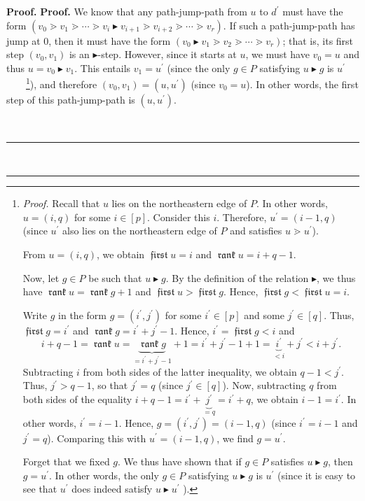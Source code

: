 \documentclass[numbers=enddot,12pt,final,onecolumn,notitlepage]{scrartcl}%
\theoremstyle{definition}
\newenvironment{verlong}{}{}
\DeclareMathOperator{\first}{\mathfrak{first}}
\DeclareMathOperator{\rank}{\mathfrak{rank}}
\newenvironment{proof}[1][Proof]{\noindent\textbf{#1.} }{\ \rule{0.5em}{0.5em}}
\begin{document}
\begin{proof}
\begin{verlong}
\begin{proof}
We know that any path-jump-path from $u$ to $d^{\prime}$ must have the form
\newline$\left(  v_{0}\gtrdot v_{1}\gtrdot\cdots\gtrdot v_{i}%
\blacktriangleright v_{i+1}\gtrdot v_{i+2}\gtrdot\cdots\gtrdot v_{r}\right)
$. If such a path-jump-path has jump at $0$, then it must have the form
$\left(  v_{0}\blacktriangleright v_{1}\gtrdot v_{2}\gtrdot\cdots\gtrdot
v_{r}\right)  $; that is, its first step $\left(  v_{0},v_{1}\right)  $ is an
$\blacktriangleright$-step. However, since it starts at $u$, we must have
$v_{0}=u$ and thus $u=v_{0}\blacktriangleright v_{1}$. This entails
$v_{1}=u^{\prime}$ (since the only $g\in P$ satisfying $u\blacktriangleright
g$ is $u^{\prime}$\ \ \ \ \footnote{\textit{Proof.} Recall that $u$ lies on
the northeastern edge of $P$. In other words, $u=\left(  i,q\right)  $ for
some $i\in\left[  p\right]  $. Consider this $i$. Therefore, $u^{\prime
}=\left(  i-1,q\right)  $ (since $u^{\prime}$ also lies on the northeastern
edge of $P$ and satisfies $u\gtrdot u^{\prime}$).
\par
From $u=\left(  i,q\right)  $, we obtain $\first u=i$ and $\rank u=i+q-1$.
\par
Now, let $g\in P$ be such that $u\blacktriangleright g$. By the definition of
the relation $\blacktriangleright$, we thus have $\rank u=\rank g+1$ and
$\first u>\first g$. Hence, $\first g<\first u=i$.
\par
Write $g$ in the form $g=\left(  i^{\prime},j^{\prime}\right)  $ for some
$i^{\prime}\in\left[  p\right]  $ and some $j^{\prime}\in\left[  q\right]  $.
Thus, $\first g=i^{\prime}$ and $\rank g=i^{\prime}+j^{\prime}-1$. Hence,
$i^{\prime}=\first g<i$ and%
\[
i+q-1=\rank u=\underbrace{\rank g}_{=i^{\prime}+j^{\prime}-1}+1=i^{\prime
}+j^{\prime}-1+1=\underbrace{i^{\prime}}_{<i}+j^{\prime}<i+j^{\prime}.
\]
Subtracting $i$ from both sides of the latter inequality, we obtain
$q-1<j^{\prime}$. Thus, $j^{\prime}>q-1$, so that $j^{\prime}=q$ (since
$j^{\prime}\in\left[  q\right]  $). Now, subtracting $q$ from both sides of
the equality $i+q-1=i^{\prime}+\underbrace{j^{\prime}}_{=q}=i^{\prime}+q$, we
obtain $i-1=i^{\prime}$. In other words, $i^{\prime}=i-1$. Hence, $g=\left(
i^{\prime},j^{\prime}\right)  =\left(  i-1,q\right)  $ (since $i^{\prime}=i-1$
and $j^{\prime}=q$). Comparing this with $u^{\prime}=\left(  i-1,q\right)  $,
we find $g=u^{\prime}$.
\par
Forget that we fixed $g$. We thus have shown that if $g\in P$ satisfies
$u\blacktriangleright g$, then $g=u^{\prime}$. In other words, the only $g\in
P$ satisfying $u\blacktriangleright g$ is $u^{\prime}$ (since it is easy to
see that $u^{\prime}$ does indeed satisfy $u\blacktriangleright u^{\prime}$%
).}), and therefore $\left(  v_{0},v_{1}\right)  =\left(  u,u^{\prime}\right)
$ (since $v_{0}=u$). In other words, the first step of this path-jump-path is
$\left(  u,u^{\prime}\right)  $.


\end{proof}
\end{verlong}
\end{proof}
\end{document}
